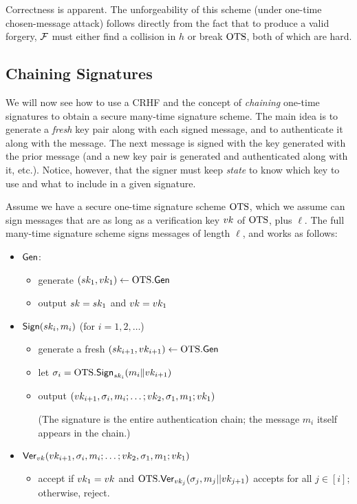 \documentclass[11pt]{article}
\begin{document}
Correctness is apparent.  The unforgeability of this scheme (under
one-time chosen-message attack) follows directly from the fact that to
produce a valid forgery, $\mathcal{F}$ must either find a collision in $h$ or
break $\text{OTS}$, both of which are hard.

\subsection{Chaining Signatures}
\label{sec:chaining-signatures}

We will now see how to use a CRHF and the concept of \emph{chaining}
one-time signatures to obtain a secure many-time signature scheme.
The main idea is to generate a \emph{fresh} key pair along with each
signed message, and to authenticate it along with the message.  The
next message is signed with the key generated with the prior message
(and a new key pair is generated and authenticated along with it,
etc.).  Notice, however, that the signer must keep \emph{state} to
know which key to use and what to include in a given signature.

Assume we have a secure one-time signature scheme $\text{OTS}$, which we
assume can sign messages that are as long as a verification key $vk$
of $\text{OTS}$, plus $\ell$.  The full many-time signature scheme signs
messages of length $\ell$, and works as follows:

\begin{itemize}
\item $\mathsf{Gen}$:
  \begin{itemize}
  \item generate $(sk_1,vk_1) \gets \text{OTS}.\mathsf{Gen}$
  \item output $sk = sk_1$ and $vk = vk_1$
  \end{itemize}

\item $\mathsf{Sign}(sk_i,m_i)$ (for $i=1,2, \ldots$)
  \begin{itemize}
  \item generate a fresh $(sk_{i+1}, vk_{i+1}) \gets \text{OTS}.\mathsf{Gen}$
  \item let $\sigma_i = \text{OTS}.\mathsf{Sign}_{sk_{i}}(m_i \| vk_{i+1})$
  \item output $(vk_{i+1}, \sigma_{i}, m_{i}; \ldots; vk_{2},
    \sigma_1, m_1; vk_1)$

    (The signature is the entire authentication chain; the message
    $m_{i}$ itself appears in the chain.)
  \end{itemize}

\item $\mathsf{Ver}_{vk}(vk_{i+1}, \sigma_i,m_i; \ldots; vk_{2},
  \sigma_1, m_1; vk_1)$
  \begin{itemize}
  \item accept if $vk_{1} = vk$ and
    $\text{OTS}.\mathsf{Ver}_{vk_{j}}(\sigma_{j}, m_j||vk_{j+1})$ accepts for
    all $j \in [i]$; otherwise, reject.
  \end{itemize}
\end{itemize}
\end{document}
